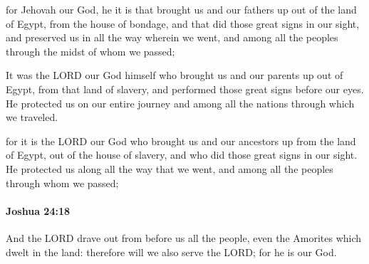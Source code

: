 			\begin{versebox}
					\item[BHS] 
					\item[ASV] for Jehovah our God, he it is that brought us and our fathers up out of the land of Egypt, from the house of bondage, and that did those great signs in our sight, and preserved us in all the way wherein we went, and among all the peoples through the midst of whom we passed;
					\item[NIV] It was the LORD our God himself who brought us and our parents up out of Egypt, from that land of slavery, and performed those great signs before our eyes. He protected us on our entire journey and among all the nations through which we traveled.
					\item[NRSV] for it is the LORD our God who brought us and our ancestors up from the land of Egypt, out of the house of slavery, and who did those great signs in our sight. He protected us along all the way that we went, and among all the peoples through whom we passed;
			\end{versebox}

		\paragraph{Joshua 24:18} %
			\label{JOSHUA-24-18}

			And the LORD drave out from before us all the people, even the Amorites which dwelt in the land: therefore will we also serve the LORD; for he is our God.

